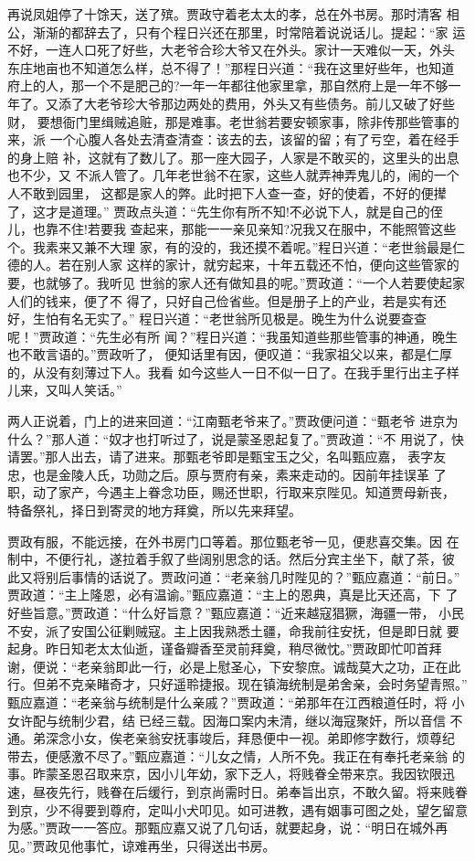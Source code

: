 再说凤姐停了十馀天，送了殡。贾政守着老太太的孝，总在外书房。那时清客
相公，渐渐的都辞去了，只有个程日兴还在那里，时常陪着说说话儿。提起：“家
运不好，一连人口死了好些，大老爷合珍大爷又在外头。家计一天难似一天，外头
东庄地亩也不知道怎么样，总不得了！”那程日兴道：“我在这里好些年，也知道
府上的人，那一个不是肥己的?一年一年都往他家里拿，那自然府上是一年不够一
年了。又添了大老爷珍大爷那边两处的费用，外头又有些债务。前儿又破了好些财，
要想衙门里缉贼追赃，那是难事。老世翁若要安顿家事，除非传那些管事的来，派
一个心腹人各处去清查清查：该去的去，该留的留；有了亏空，着在经手的身上赔
补，这就有了数儿了。那一座大园子，人家是不敢买的，这里头的出息也不少，又
不派人管了。几年老世翁不在家，这些人就弄神弄鬼儿的，闹的一个人不敢到园里，
这都是家人的弊。此时把下人查一查，好的使着，不好的便撵了，这才是道理。”
贾政点头道：“先生你有所不知!不必说下人，就是自己的侄儿，也靠不住!若要我
查起来，那能一一亲见亲知?况我又在服中，不能照管这些个。我素来又兼不大理
家，有的没的，我还摸不着呢。”程日兴道：“老世翁最是仁德的人。若在别人家
这样的家计，就穷起来，十年五载还不怕，便向这些管家的要，也就够了。我听见
世翁的家人还有做知县的呢。”贾政道：“一个人若要使起家人们的钱来，便了不
得了，只好自己俭省些。但是册子上的产业，若是实有还好，生怕有名无实了。”
程日兴道：“老世翁所见极是。晚生为什么说要查查呢！”贾政道：“先生必有所
闻？”程日兴道：“我虽知道些那些管事的神通，晚生也不敢言语的。”贾政听了，
便知话里有因，便叹道：“我家祖父以来，都是仁厚的，从没有刻薄过下人。我看
如今这些人一日不似一日了。在我手里行出主子样儿来，又叫人笑话。”

两人正说着，门上的进来回道：“江南甄老爷来了。”贾政便问道：“甄老爷
进京为什么？”那人道：“奴才也打听过了，说是蒙圣恩起复了。”贾政道：“不
用说了，快请罢。”那人出去，请了进来。那甄老爷即是甄宝玉之父，名叫甄应嘉，
表字友忠，也是金陵人氏，功勋之后。原与贾府有亲，素来走动的。因前年挂误革
了职，动了家产，今遇主上眷念功臣，赐还世职，行取来京陛见。知道贾母新丧，
特备祭礼，择日到寄灵的地方拜奠，所以先来拜望。

贾政有服，不能远接，在外书房门口等着。那位甄老爷一见，便悲喜交集。因
在制中，不便行礼，遂拉着手叙了些阔别思念的话。然后分宾主坐下，献了茶，彼
此又将别后事情的话说了。贾政问道：“老亲翁几时陛见的？”甄应嘉道：“前日。”
贾政道：“主上隆恩，必有温谕。”甄应嘉道：“主上的恩典，真是比天还高，下
了好些旨意。”贾政道：“什么好旨意？”甄应嘉道：“近来越寇猖獗，海疆一带，
小民不安，派了安国公征剿贼寇。主上因我熟悉土疆，命我前往安抚，但是即日就
要起身。昨日知老太太仙逝，谨备瓣香至灵前拜奠，稍尽微忱。”贾政即忙叩首拜
谢，便说：“老亲翁即此一行，必是上慰圣心，下安黎庶。诚哉莫大之功，正在此
行。但弟不克亲睹奇才，只好遥聆捷报。现在镇海统制是弟舍亲，会时务望青照。”
甄应嘉道：“老亲翁与统制是什么亲戚？”贾政道：“弟那年在江西粮道任时，将
小女许配与统制少君，结已经三载。因海口案内未清，继以海寇聚奸，所以音信
不通。弟深念小女，俟老亲翁安抚事竣后，拜恳便中一视。弟即修字数行，烦尊纪
带去，便感激不尽了。”甄应嘉道：“儿女之情，人所不免。我正在有奉托老亲翁
的事。昨蒙圣恩召取来京，因小儿年幼，家下乏人，将贱眷全带来京。我因钦限迅
速，昼夜先行，贱眷在后缓行，到京尚需时日。弟奉旨出京，不敢久留。将来贱眷
到京，少不得要到尊府，定叫小犬叩见。如可进教，遇有姻事可图之处，望乞留意
为感。”贾政一一答应。那甄应嘉又说了几句话，就要起身，说：“明日在城外再
见。”贾政见他事忙，谅难再坐，只得送出书房。

